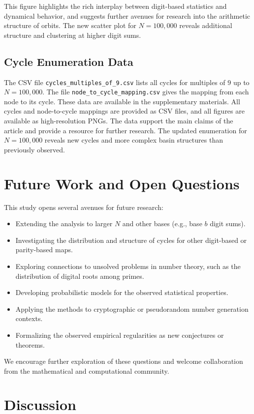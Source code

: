 \documentclass[12pt]{article}
\begin{document}
This figure highlights the rich interplay between digit-based statistics and dynamical behavior, and suggests further avenues for research into the arithmetic structure of orbits. The new scatter plot for $N=100,000$ reveals additional structure and clustering at higher digit sums.

\subsection{Cycle Enumeration Data}
The CSV file \texttt{cycles\_multiples\_of\_9.csv} lists all cycles for multiples of $9$ up to $N=100,000$. The file \texttt{node\_to\_cycle\_mapping.csv} gives the mapping from each node to its cycle. These data are available in the supplementary materials. All cycles and node-to-cycle mappings are provided as CSV files, and all figures are available as high-resolution PNGs. The data support the main claims of the article and provide a resource for further research. The updated enumeration for $N=100,000$ reveals new cycles and more complex basin structures than previously observed.

\section{Future Work and Open Questions}
This study opens several avenues for future research:
\begin{itemize}
    \item Extending the analysis to larger $N$ and other bases (e.g., base $b$ digit sums).
    \item Investigating the distribution and structure of cycles for other digit-based or parity-based maps.
    \item Exploring connections to unsolved problems in number theory, such as the distribution of digital roots among primes.
    \item Developing probabilistic models for the observed statistical properties.
    \item Applying the methods to cryptographic or pseudorandom number generation contexts.
    \item Formalizing the observed empirical regularities as new conjectures or theorems.
\end{itemize}
We encourage further exploration of these questions and welcome collaboration from the mathematical and computational community.


\section{Discussion}
\end{document}
